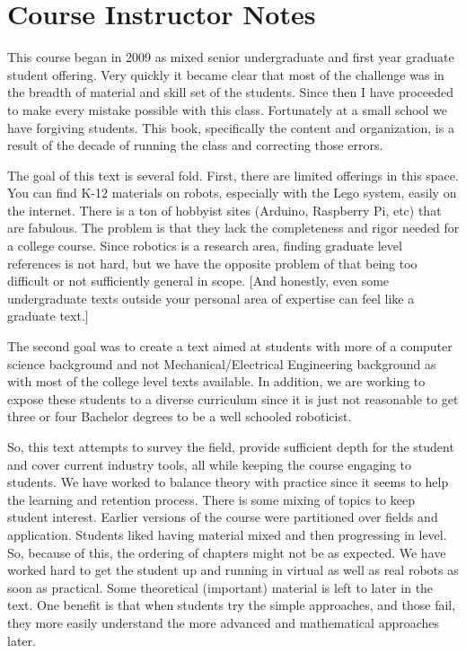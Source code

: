 \hypertarget{course-instructor-notes}{%
\section{Course Instructor Notes}\label{course-instructor-notes}}

This course began in 2009 as mixed senior undergraduate and first year
graduate student offering. Very quickly it became clear that most of the
challenge was in the breadth of material and skill set of the students.
Since then I have proceeded to make every mistake possible with this
class. Fortunately at a small school we have forgiving students. This
book, specifically the content and organization, is a result of the
decade of running the class and correcting those errors.

The goal of this text is several fold. First, there are limited
offerings in this space. You can find K-12 materials on robots,
especially with the Lego system, easily on the internet. There is a ton
of hobbyist sites (Arduino, Raspberry Pi, etc) that are fabulous. The
problem is that they lack the completeness and rigor needed for a
college course. Since robotics is a research area, finding graduate
level references is not hard, but we have the opposite problem of that
being too difficult or not sufficiently general in scope. {[}And
honestly, even some undergraduate texts outside your personal area of
expertise can feel like a graduate text.{]}

The second goal was to create a text aimed at students with more of a
computer science background and not Mechanical/Electrical Engineering
background as with most of the college level texts available. In
addition, we are working to expose these students to a diverse
curriculum since it is just not reasonable to get three or four Bachelor
degrees to be a well schooled roboticist.

So, this text attempts to survey the field, provide sufficient depth for
the student and cover current industry tools, all while keeping the
course engaging to students. We have worked to balance theory with
practice since it seems to help the learning and retention process.
There is some mixing of topics to keep student interest. Earlier
versions of the course were partitioned over fields and application.
Students liked having material mixed and then progressing in level. So,
because of this, the ordering of chapters might not be as expected. We
have worked hard to get the student up and running in virtual as well as
real robots as soon as practical. Some theoretical (important) material
is left to later in the text. One benefit is that when students try the
simple approaches, and those fail, they more easily understand the more
advanced and mathematical approaches later.

